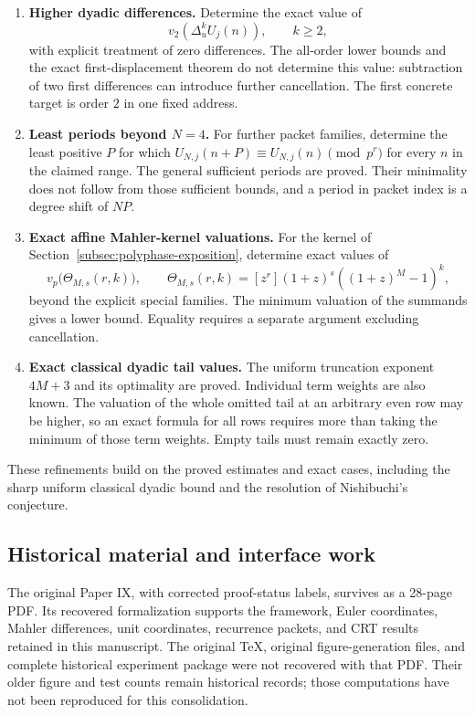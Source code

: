 \begin{enumerate}
\item \textbf{Higher dyadic differences.}
Determine the exact value of
\[
v_2\!\left(\Delta_u^kU_j(n)\right),\qquad k\geq2,
\]
with explicit treatment of zero differences. The all-order lower bounds and
the exact first-displacement theorem do not determine this value: subtraction
of two first differences can introduce further cancellation. The first
concrete target is order $2$ in one fixed address.

\item \textbf{Least periods beyond $N=4$.}
For further packet families, determine the least positive $P$ for which
$U_{N,j}(n+P)\equiv U_{N,j}(n)\pmod{p^r}$ for every $n$ in the claimed range.
The general sufficient periods are proved. Their minimality does not follow
from those sufficient bounds, and a period in packet index is a degree shift
of $NP$.

\item \textbf{Exact affine Mahler-kernel valuations.}
For the kernel of Section~\ref{subsec:polyphase-exposition}, determine exact
values of
\[
v_p\bigl(\Theta_{M,s}(r,k)\bigr),\qquad
\Theta_{M,s}(r,k)=[z^r](1+z)^s((1+z)^M-1)^k,
\]
beyond the explicit special families. The minimum valuation of the summands
gives a lower bound. Equality requires a separate argument excluding
cancellation.

\item \textbf{Exact classical dyadic tail values.}
The uniform truncation exponent $4M+3$ and its optimality are proved.
Individual term weights are also known. The valuation of the whole omitted
tail at an arbitrary even row may be higher, so an exact formula for all rows
requires more than taking the minimum of those term weights. Empty tails
must remain exactly zero.
\end{enumerate}

These refinements build on the proved estimates and exact cases, including
the sharp uniform classical dyadic bound and the resolution of Nishibuchi's
conjecture.

\subsection{Historical material and interface work}
\label{subsec:historical-scope}

The original Paper IX, with corrected proof-status labels, survives as a
28-page PDF. Its recovered formalization supports the framework, Euler
coordinates, Mahler differences,
unit coordinates, recurrence packets, and CRT results retained in this
manuscript. The original TeX, original figure-generation files, and complete
historical experiment package were not recovered with that PDF. Their older
figure and test counts remain historical records; those computations have
not been reproduced for this consolidation.

